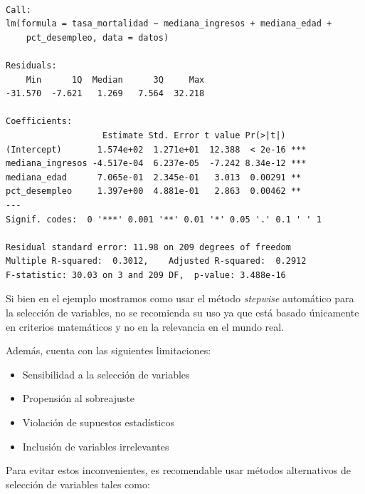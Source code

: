\documentclass[
  spanish,
  a4paper,
]{scrbook}
\begin{document}
\begin{verbatim}

Call:
lm(formula = tasa_mortalidad ~ mediana_ingresos + mediana_edad + 
    pct_desempleo, data = datos)

Residuals:
    Min      1Q  Median      3Q     Max 
-31.570  -7.621   1.269   7.564  32.218 

Coefficients:
                   Estimate Std. Error t value Pr(>|t|)    
(Intercept)       1.574e+02  1.271e+01  12.388  < 2e-16 ***
mediana_ingresos -4.517e-04  6.237e-05  -7.242 8.34e-12 ***
mediana_edad      7.065e-01  2.345e-01   3.013  0.00291 ** 
pct_desempleo     1.397e+00  4.881e-01   2.863  0.00462 ** 
---
Signif. codes:  0 '***' 0.001 '**' 0.01 '*' 0.05 '.' 0.1 ' ' 1

Residual standard error: 11.98 on 209 degrees of freedom
Multiple R-squared:  0.3012,    Adjusted R-squared:  0.2912 
F-statistic: 30.03 on 3 and 209 DF,  p-value: 3.488e-16
\end{verbatim}

Si bien en el ejemplo mostramos como usar el método \emph{stepwise}
automático para la selección de variables, no se recomienda su uso ya
que está basado únicamente en criterios matemáticos y no en la
relevancia en el mundo real.

Además, cuenta con las siguientes limitaciones:

\begin{itemize}
\item
  Sensibilidad a la selección de variables
\item
  Propensión al sobreajuste
\item
  Violación de supuestos estadísticos
\item
  Inclusión de variables irrelevantes
\end{itemize}

Para evitar estos inconvenientes, es recomendable usar métodos
alternativos de selección de variables tales como:
\end{document}
